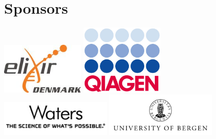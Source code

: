 \section*{\color{eubicRed} Sponsors}
\begin{center}
  \includegraphics[width=0.3\textwidth]{graphics/elixir.jpg}\hspace*{2cm}
  \includegraphics[width=0.3\textwidth]{graphics/qiagen.jpg}\\[1cm]
  \includegraphics[width=0.4\textwidth]{graphics/waters.jpg}\hspace*{1cm}
  \includegraphics[width=0.4\textwidth]{graphics/UiBlogo_Eng_gray_m_V8.png}
\end{center}
